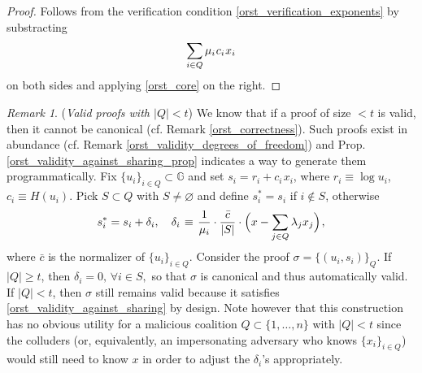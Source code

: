 \documentclass[10pt, psamsfonts, reqno]{amsart}
\theoremstyle{definition}
\theoremstyle{remark}
\newtheorem{rem}[thm]{Remark}
\numberwithin{equation}{section}
\begin{document}
\begin{proof}
Follows from the verification condition
\eqref{orst_verification_exponents}
by substracting
\vspace{5pt}
\begin{equation*}
\sum_{i \in Q} \mu_i\hspace{0.5pt}c_i\hspace{0.5pt}x_i
\vspace{5pt}
\end{equation*}
on both sides and applying \eqref{orst_core}
on the right.
\end{proof}

\begin{rem}\label{orst_valid_below_rem}
(\textit{Valid proofs with $|Q| < t$})
We know that if a proof of size $<t$ is valid,
then it cannot be canonical (cf. Remark \ref{orst_correctness}).
Such proofs exist in abundance
(cf. Remark \ref{orst_validity_degrees_of_freedom})
and Prop. \ref{orst_validity_against_sharing_prop}
indicates a way to generate them programmatically.
Fix $\{u_i\}_{i \in Q} \subset \mathbb{G}$
and set $s_i = r_i + c_i\hspace{1pt}x_i$, where
$r_i \equiv \log u_i$, $c_i \equiv H(u_i)$.
Pick $S \subset Q$ with $S \neq \varnothing$
and define
$s_i^* = s_i$ if $i \not \in S$, otherwise
\vspace{5pt}
\begin{equation*}
s_i^* = s_i + \delta_i,
\ \ \ \delta_i
	\hspace{1pt}
	\equiv
	\hspace{1pt}
	\frac{1}{\mu_i}
	\cdot
	\frac{\bar{c}}{|S|}
	\cdot
	\Big(
		x
		-
		\sum_{j \in Q} \lambda_j x_j
	\Big)
	\hspace{1pt}
	,
\vspace{5pt}
\end{equation*}
where $\bar{c}$ is the normalizer of $\{u_i\}_{i \in Q}$.
Consider the proof $\sigma = \{(u_i, s_i)\}_{Q}$.
If $|Q| \ge t$, then $\delta_i = 0,\hspace{2pt} \forall i \in S,$
so that $\sigma$ is canonical and thus automatically valid.
If $|Q| < t$, then $\sigma$ still remains valid because
it satisfies \eqref{orst_validity_against_sharing}
by design.
Note however that this construction has no obvious utility
for a malicious coalition $Q \subset \{1, \dots, n\}$
with $|Q| < t$ since the colluders
(or, equivalently, an impersonating adversary
who knows $\{x_i\}_{i \in Q}$)
would still need to know $x$ in order to adjust
the $\delta_i$'s appropriately.
\end{rem}
\end{document}
